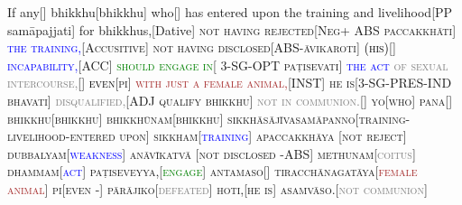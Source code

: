 \documentclass[11pt]{article}
\newcommand{\vsp}{\vspace{2mm}}
\newcommand{\NUL}[1]{\textcolor{Black}{#1}}
\newcommand{\NOM}[1]{\textcolor{Mahogony}{#1}}
\newcommand{\ACC}[1]{\textcolor{Blue}{#1}}
\newcommand{\INS}[1]{\textcolor{Brown}{#1}}
\newcommand{\DAT}[1]{\textcolor{Raw Sienna}{#1}}
\newcommand{\ABS}[1]{\scshape {#1}}
\newcommand{\OPT}[1]{\textcolor{green}{#1}}
\newcommand{\PRSPTCP}[1]{\textcolor{YellowOrange}{#1}}
\newcommand{\PRSIND}[1]{\textcolor{Melon}{#1}}
\newcommand{\ADJ}[1]{\textcolor{Gray}{#1}}
\begin{document}
\begin{paracol}{2}
\begin{column}
\begingl
\NOM{If any}[] \NOM{bhikkhu}[bhikkhu] {who}[] \PRSPTCP{has entered upon the training and livelihood}[PP samāpajjati] \DAT{for bhikkhus,}[Dative] \ABS{not having rejected}[Neg+ ABS paccakkhāti] \ACC{the training,}[Accusitive] \ABS{not having disclosed}[ABS-āvikaroti] \NUL{(his)}[] \ACC{incapability,}[ACC] \OPT{should engage in}[ 3-SG-OPT paṭisevati] \ACC{the act} \ADJ{of sexual intercourse,}[] \NUL{even}[pi] \INS{with just a female animal,}[INST] \PRSIND{he is}[3-SG-PRES-IND bhavati] \ADJ{disqualified,}[ADJ qualify bhikkhu] \ADJ{not in communion.}[]
\endgl
\vsp
\switchcolumn
\begingl
yo[\NOM{who}] pana[] bhikkhu[\NOM{bhikkhu}] bhikkhūnaṁ[\DAT{bhikkhu}] sikkhāsājīvasamāpanno[\PRSPTCP{training-livelihood-entered upon}] sikkhaṁ[\ACC{training}] apaccakkhāya [\ABS{not reject}] dubbalyaṁ[\ACC{weakness}] anāvīkatvā [not disclosed -\ABS{ABS}] methunaṁ[\ADJ{coitus}] dhammaṁ[\ACC{act}] paṭiseveyya,[\OPT{engage}] antamaso[] tiracchānagatāya[\INS{female animal}] pi[even -] pārājiko[\ADJ{defeated}] hoti,[\PRSIND{he is}] asaṁvāso.[\ADJ{not communion}] 
\endgl
\switchcolumn*

\vsp
\switchcolumn

\switchcolumn*


\vsp
\switchcolumn

\switchcolumn*


\vsp
\switchcolumn

\switchcolumn*

\end{column}
\end{paracol}
\end{document}
